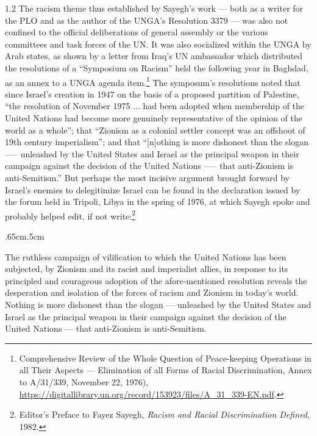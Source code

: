 \documentclass[../unravbook.tex]{subfiles}
\begin{document}
\begin{spacing}{1.2}
The racism theme thus established by Sayegh's work --- both as a writer for the PLO and as the author of the UNGA's Resolution 3379 --- was also not confined to the official deliberations of general assembly or the various committees and task forces of the UN. It was also socialized  within the UNGA by Arab states, as shown by a letter from Iraq's UN ambassador which distributed the resolutions of a ``Symposium on Racism'' held the following year in Baghdad, as an annex to a UNGA agenda item.\footnote{Comprehensive Review of the Whole Question of Peace-keeping Operations in all Their Aspects --- Elimination of all Forms of Racial Discrimination, Annex to A/31/339, November 22, 1976), \url{https://digitallibrary.un.org/record/153923/files/A_31_339-EN.pdf}.} The symposum's resolutions noted that since Israel's creation in 1947 on the basis of a proposed partition of Palestine, ``the resolution of November 1975 ... had been adopted when membership of the United Nations had become more genuinely representative of the opinion of the world as a whole''; that ``Zionism as a colonial settler concept was an offshoot of 19th century imperialism''; and that ``[n]othing is more dishonest than the slogan --— unleashed by the United States and Israel as the principal weapon in their campaign against the decision of the United Nations --— that anti-Zionism is anti-Semitism.'' But perhaps the most incisive argument brought forward by Israel's enemies to delegitimize Israel can be found in the declaration issued by the forum held in Tripoli, Libya in the spring of 1976, at which Sayegh spoke and probably helped edit, if not write:\footnote{Editor's Preface to Fayez Sayegh, \textit{Racism and Racial Discrimination Defined}, 1982.}

\begin{adjustwidth}{.65cm}{.5cm}
  \begin{singlespace} 
  The ruthless campaign of vilification to which the United Nations has been subjected, by Zionism and its racist and imperialist allies, in response to its principled and courageous adoption of the afore-mentioned resolution reveals the desperation and isolation of the forces of racism and Zionism in today's world. Nothing is more dishonest than the slogan —    unleashed by the United States and Israel as the principal weapon in their campaign against the decision of the United Nations — that anti-Zionism is anti-Semitism.
  \end{singlespace}
\end{adjustwidth}


\end{spacing}
\end{document}
